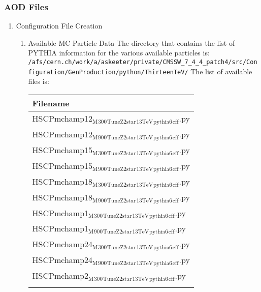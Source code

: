 \documentclass[11pt]{article}
\begin{document}
\subsubsection{AOD Files}
\label{sec-1-1-2}
\begin{enumerate}
\item Configuration File Creation
\label{sec-1-1-2-1}

\begin{enumerate}
\item Available MC Particle Data
\label{sec-1-1-2-1-1}
The directory that contains the list of PYTHIA information for the
various available particles is:
\texttt{/afs/cern.ch/work/a/askeeter/private/CMSSW\_7\_4\_4\_patch4/src/Configuration/GenProduction/python/ThirteenTeV/}
The list of available files is:
\begin{center}
\begin{tabular}{l}
Filename\\
\hline
HSCPmchamp12$_{\text{M}}$$_{\text{300}}$$_{\text{TuneZ2star}}$$_{\text{13TeV}}$$_{\text{pythia6}}$$_{\text{cff}}$.py\\
HSCPmchamp12$_{\text{M}}$$_{\text{900}}$$_{\text{TuneZ2star}}$$_{\text{13TeV}}$$_{\text{pythia6}}$$_{\text{cff}}$.py\\
HSCPmchamp15$_{\text{M}}$$_{\text{300}}$$_{\text{TuneZ2star}}$$_{\text{13TeV}}$$_{\text{pythia6}}$$_{\text{cff}}$.py\\
HSCPmchamp15$_{\text{M}}$$_{\text{900}}$$_{\text{TuneZ2star}}$$_{\text{13TeV}}$$_{\text{pythia6}}$$_{\text{cff}}$.py\\
HSCPmchamp18$_{\text{M}}$$_{\text{300}}$$_{\text{TuneZ2star}}$$_{\text{13TeV}}$$_{\text{pythia6}}$$_{\text{cff}}$.py\\
HSCPmchamp18$_{\text{M}}$$_{\text{900}}$$_{\text{TuneZ2star}}$$_{\text{13TeV}}$$_{\text{pythia6}}$$_{\text{cff}}$.py\\
HSCPmchamp1$_{\text{M}}$$_{\text{300}}$$_{\text{TuneZ2star}}$$_{\text{13TeV}}$$_{\text{pythia6}}$$_{\text{cff}}$.py\\
HSCPmchamp1$_{\text{M}}$$_{\text{900}}$$_{\text{TuneZ2star}}$$_{\text{13TeV}}$$_{\text{pythia6}}$$_{\text{cff}}$.py\\
HSCPmchamp24$_{\text{M}}$$_{\text{300}}$$_{\text{TuneZ2star}}$$_{\text{13TeV}}$$_{\text{pythia6}}$$_{\text{cff}}$.py\\
HSCPmchamp24$_{\text{M}}$$_{\text{900}}$$_{\text{TuneZ2star}}$$_{\text{13TeV}}$$_{\text{pythia6}}$$_{\text{cff}}$.py\\
HSCPmchamp2$_{\text{M}}$$_{\text{300}}$$_{\text{TuneZ2star}}$$_{\text{13TeV}}$$_{\text{pythia6}}$$_{\text{cff}}$.py\\
$$
\end{tabular}
\end{center}
\end{enumerate}
\end{enumerate}
\end{document}
